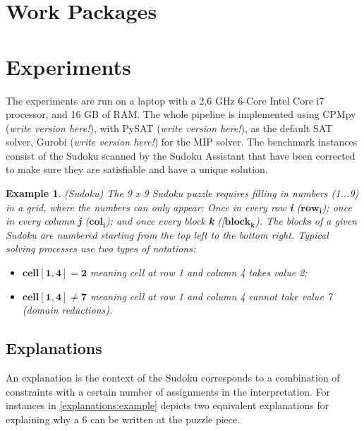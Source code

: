 \documentclass[a4paper,UKenglish,cleveref, autoref, thm-restate]{lipics-v2021}
\newtheorem{example}{Example}
\begin{document}
	\section{Work Packages}

\thispagestyle{empty}
\clearpage
\thispagestyle{empty}
	\section{Experiments}

The experiments are run on a laptop with a  2,6 GHz 6-Core Intel Core i7 processor, and 16 GB of RAM.
The whole pipeline is implemented using CPMpy (\textit{write version here!}), with PySAT (\textit{write version here!}), as the default SAT solver, Gurobi (\textit{write version here!}) for the MIP solver. The benchmark instances consist of the Sudoku scanned by the Sudoku Assistant that have been corrected to make sure they are satisfiable and have a unique solution.

\begin{example}
	(Sudoku) The 9 x 9 Sudoku puzzle requires filling in numbers (1...9) in a grid, where the numbers can only appear: Once in every row \textbf{i} ($\mathbf{row_{i}}$);
	once in every column \textbf{j} ($\mathbf{col_{i}}$); and once every block \textbf{k} ([$\mathbf{block_{k}}$). The blocks of a given Sudoku are numbered starting from the top left to the bottom right. Typical solving processes use two types of notations: 
	\begin{itemize}
		\item $\mathbf{cell[1, 4] = 2}$ meaning  cell at row 1 and column 4 takes value 2;
		\item $\mathbf{cell[1, 4] \neq 7}$ meaning cell at row 1 and column 4 cannot take value 7 (domain reductions).
	\end{itemize}
\end{example}

\subsection{Explanations}

An explanation is the context of the Sudoku corresponds to a combination of constraints with a certain number of assignments in the interpretation. For instances in \cref{explanations:example} depicts two equivalent explanations for explaining why a 6 can be written at the puzzle piece. 
\end{document}
